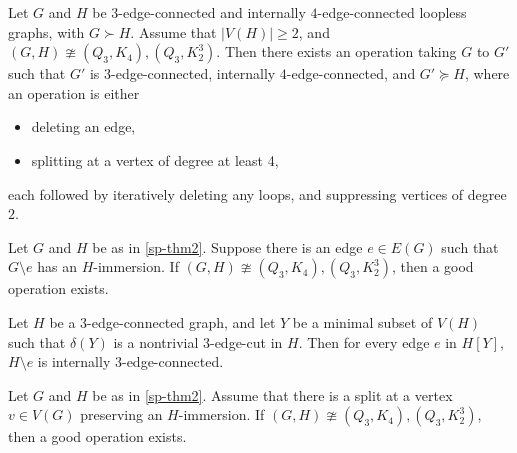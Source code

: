 \documentclass[10pt,a4paper]{amsart}
\begin{document}
\begin{theorem}
\label{sp-thm2}
Let $G$ and $H$ be $3$-edge-connected and internally $4$-edge-connected loopless graphs, with $G \succ H$. Assume that $|V(H)|\ge 2$, and $(G, H) \ncong (Q_3, K_4), (Q_3, K_2^3)$. Then there exists an operation taking $G$ to $G'$ such that $G'$ is $3$-edge-connected, internally $4$-edge-connected, and $G' \succeq   H$, where an operation is either
\begin{itemize}
\item deleting an edge,
\item splitting at a vertex of degree at least 4,
\end{itemize}
each followed by iteratively deleting any loops, and suppressing vertices of degree $2$.
\end{theorem}

\begin{lemma}
\label{lem9}
Let $G$ and $H$ be as in \cref{sp-thm2}. Suppose there is an edge $e \in E(G)$ such that $G \setminus e$ has an $H$-immersion. If $(G, H) \ncong (Q_3, K_4), (Q_3, K_2^3)$, then a good operation exists.
\end{lemma}

\begin{lemma}
\label{3econdel}
Let $H$ be a $3$-edge-connected graph, and let $Y$ be a minimal subset of $V(H)$ such that $\delta(Y)$ is a nontrivial $3$-edge-cut in $H$. Then for every edge $e$ in $H[Y]$, $H\setminus e$ is internally $3$-edge-connected.
\end{lemma}

\begin{lemma}
\label{lem10}
Let $G$ and $H$ be as in \cref{sp-thm2}. Assume that there is a split at a vertex $v \in V(G)$ preserving an $H$-immersion. If $(G, H) \ncong (Q_3, K_4), (Q_3, K_2^3)$, then a good operation exists.
\end{lemma}
\end{document}

